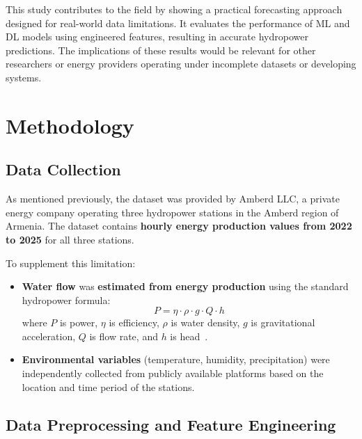 \documentclass[12pt]{article}
\begin{document}
This study contributes to the field by showing a practical forecasting approach designed for real-world data limitations. It evaluates the performance of ML and DL models using engineered features, resulting in accurate hydropower predictions. The implications of these results would be relevant for other researchers or energy providers operating under incomplete datasets or developing systems.


\section{Methodology}
\label{sec:Methodology}

\subsection{Data Collection}
\label{sec:data}

As mentioned previously, the dataset was provided by Amberd LLC, a private energy company operating three hydropower stations in the Amberd region of Armenia. The dataset contains \textbf{hourly energy production values from 2022 to 2025} for all three stations.

To supplement this limitation:
\begin{itemize}
    \item \textbf{Water flow} was \textbf{estimated from energy production} using the standard hydropower formula:\[P = \eta \cdot \rho \cdot g \cdot Q \cdot h\]
    where \( P \) is power, \( \eta \) is efficiency, \( \rho \) is water density, \( g \) is gravitational acceleration, \( Q \) is flow rate, and \( h \) is head~\cite{nascimento2017ridge}.

    \item \textbf{Environmental variables} (temperature, humidity, precipitation) were independently collected from publicly available platforms based on the location and time period of the stations.

\end{itemize}
\subsection{Data Preprocessing and Feature Engineering}
\label{sec:features}
\end{document}
